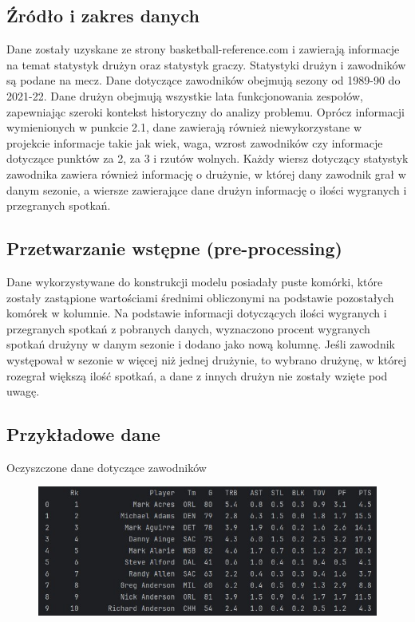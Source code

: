 \documentclass{article}
\begin{document}
\subsection{Źródło i zakres danych}

Dane zostały uzyskane ze strony basketball-reference.com i zawierają informacje na temat statystyk drużyn oraz statystyk graczy. Statystyki drużyn i zawodników są podane na mecz. Dane dotyczące zawodników obejmują sezony od 1989-90 do 2021-22. Dane drużyn obejmują wszystkie lata funkcjonowania zespołów, zapewniając szeroki kontekst historyczny do analizy problemu. Oprócz informacji wymienionych w punkcie 2.1, dane zawierają również niewykorzystane w projekcie informacje takie jak wiek, waga, wzrost zawodników czy informacje dotyczące punktów za 2, za 3 i rzutów wolnych. Każdy wiersz dotyczący statystyk zawodnika zawiera również informację o drużynie, w której dany zawodnik grał w danym sezonie, a wiersze zawierające dane drużyn informację o ilości wygranych i przegranych spotkań.

\subsection{Przetwarzanie wstępne (pre-processing)}

Dane wykorzystywane do konstrukcji modelu posiadały puste komórki, które zostały zastąpione wartościami średnimi obliczonymi na podstawie pozostałych komórek w kolumnie. Na podstawie informacji dotyczących ilości wygranych i przegranych spotkań z pobranych danych, wyznaczono procent wygranych spotkań drużyny w danym sezonie i dodano jako nową kolumnę. Jeśli zawodnik występował w sezonie w więcej niż jednej drużynie, to wybrano drużynę, w której rozegrał większą ilość spotkań, a dane z innych drużyn nie zostały wzięte pod uwagę.

\subsection{Przykładowe dane}

Oczyszczone dane dotyczące zawodników
\begin{figure}[htp]
    \centering
    \includegraphics[width=16cm]{merged_players.jpg}
    \label{fig:barplot}
\end{figure}
\end{document}
